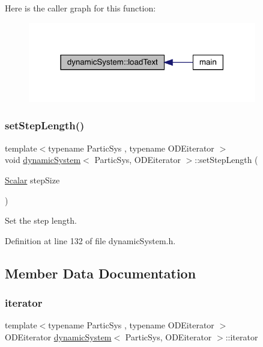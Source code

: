 Here is the caller graph for this function\+:\nopagebreak
\begin{figure}[H]
\begin{center}
\leavevmode
\includegraphics[width=283pt]{classdynamic_system_a3ff4342241733e94edce17c1a79a90a8_icgraph}
\end{center}
\end{figure}
\mbox{\label{classdynamic_system_a0392d5b36a03692d65616f3b40168948}} 
\subsubsection{\texorpdfstring{set\+Step\+Length()}{setStepLength()}}
{\footnotesize\ttfamily template$<$typename Partic\+Sys , typename O\+D\+Eiterator $>$ \\
void \mbox{\hyperlink{classdynamic_system}{dynamic\+System}}$<$ Partic\+Sys, O\+D\+Eiterator $>$\+::set\+Step\+Length (\begin{DoxyParamCaption}\item[{\mbox{\hyperlink{classdynamic_system_a6eb7b06a4ee5721a1ee0855a854c3431}{Scalar}}}]{step\+Size }\end{DoxyParamCaption})}



Set the step length. 



Definition at line 132 of file dynamic\+System.\+h.



\subsection{Member Data Documentation}
\mbox{\label{classdynamic_system_a0a13a11664ce5761ab4296b1b0421f99}} 
\subsubsection{\texorpdfstring{iterator}{iterator}}
{\footnotesize\ttfamily template$<$typename Partic\+Sys , typename O\+D\+Eiterator $>$ \\
O\+D\+Eiterator \mbox{\hyperlink{classdynamic_system}{dynamic\+System}}$<$ Partic\+Sys, O\+D\+Eiterator $>$\+::iterator}



